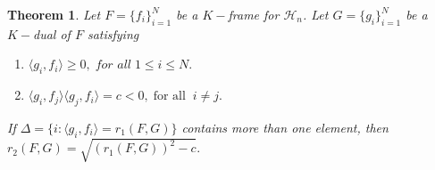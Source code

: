 \documentclass[final,1p,times]{elsarticle}
\newtheorem{thm}{Theorem}[section]
\begin{document}
	
	
	\begin{thm} \label{thm3point2*}
		Let $F= \{f_i\}_{i=1}^N$ be a $K-$frame for $\mathcal{H}_n$. Let $G= \{g_i\}_{i=1}^N$ be a $K-$dual of $F$ satisfying
		\begin{enumerate}
			\item [{\em (i)}] $\langle g_i , f_i \rangle \geq 0,  \; \textit{for all}\; 1\leq i \leq N.$
			\item [{\em (ii)}] $ \langle g_i , f_j \rangle \langle g_j , f_i \rangle  = c < 0 , \; \text{for all}\;\; i \neq j.$
		\end{enumerate}
		If  $\Delta =  \bigg\{ i: \langle g_i , f_i \rangle  = r_{1} (F,G)\bigg\} $ contains more than one element, then \; $r_{2} (F,G) = \sqrt{\left(r_{1} (F,G)\right)^2-c}.$
	\end{thm}
	
\end{document}

